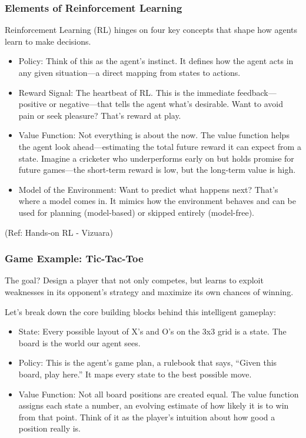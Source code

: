 \begin{frame}[fragile]\frametitle{Elements of Reinforcement Learning}

Reinforcement Learning (RL) hinges on four key concepts that shape how agents learn to make decisions.

\begin{itemize}
\item Policy: Think of this as the agent’s instinct. It defines how the agent acts in any given situation—a direct mapping from states to actions.
\item Reward Signal: The heartbeat of RL. This is the immediate feedback—positive or negative—that tells the agent what’s desirable. Want to avoid pain or seek pleasure? That’s reward at play.
\item Value Function: Not everything is about the now. The value function helps the agent look ahead—estimating the total future reward it can expect from a state. Imagine a cricketer who underperforms early on but holds promise for future games—the short-term reward is low, but the long-term value is high.
\item Model of the Environment: Want to predict what happens next? That’s where a model comes in. It mimics how the environment behaves and can be used for planning (model-based) or skipped entirely (model-free).
\end{itemize}

{\tiny (Ref: Hands-on RL - Vizuara)}

\end{frame}

\begin{frame}[fragile]\frametitle{Game Example: Tic-Tac-Toe}

The goal? Design a player that not only competes, but learns to exploit weaknesses in its opponent’s strategy and maximize its own chances of winning.

Let’s break down the core building blocks behind this intelligent gameplay:

\begin{itemize}
\item State: Every possible layout of X’s and O’s on the 3x3 grid is a state. The board is the world our agent sees.
\item Policy: This is the agent’s game plan, a rulebook that says, “Given this board, play here.” It maps every state to the best possible move.
\item Value Function: Not all board positions are created equal. The value function assigns each state a number, an evolving estimate of how likely it is to win from that point. Think of it as the player’s intuition about how good a position really is.
\end{itemize}


\end{frame}



